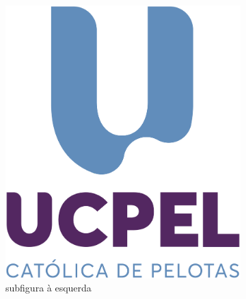 \begin{figure}[!htbp]
    \centering
    \caption{\label{fig:exemplo-subfiguras} Exemplo de subfiguras.}
    \begin{subfigure}[b]{0.3\textwidth}  %
        \centering
        \includegraphics[width=\textwidth]{img/logo_UCPEL.png}
        \caption{\label{fig:subfig1} subfigura à esquerda}
    \end{subfigure}
    \hfill
    \begin{subfigure}[b]{0.3\textwidth}  %
        \centering

\end{subfigure}
\end{figure}
